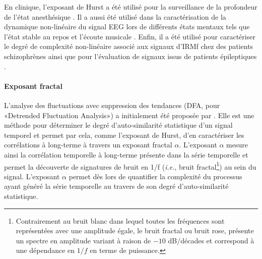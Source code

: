 En clinique, l'exposant de Hurst a été utilisé pour la surveillance de la profondeur de l'état anesthésique \citep{hosseini2018computational, lalitha2007automated, liang2012multiscale, liang2015eeg, natarajan2004nonlinear, nguyen2014monitoring, subha2010eeg}. 
Il a aussi été utilisé dans la caractérisation de la dynamique non-linéaire du signal EEG lors de différents états mentaux tels que l'état stable au repos et l'écoute musicale \citep{natarajan2004nonlinear}.
Enfin, il a été utilisé pour caractériser le degré de complexité non-linéaire associé aux signaux d'IRMf chez des patients schizophrènes \citep{sokunbi2014nonlinear} ainsi que pour l'évaluation de signaux issus de patients épileptiques \citep{kannathal2005characterization}.

\paragraph{Exposant fractal\\}
\label{alpha}

L'analyse des fluctuations avec suppression des tendances (DFA, pour «Detrended Fluctuation Analysis») a initialement été proposée par \cite{peng1993long}. 
Elle est une méthode pour déterminer le degré d'auto-similarité statistique d'un signal temporel et permet par cela, comme l'exposant de Hurst, d'en caractériser les corrélations à long-terme à travers un exposant fractal $\alpha$.
L'exposant $\alpha$ mesure ainsi la corrélation temporelle à long-terme présente dans la série temporelle et permet la découverte de signatures de bruit en 1/f (\textit{i.e.}, bruit fractal\footnote{Contrairement au bruit blanc dans lequel toutes les fréquences sont représentées avec une amplitude égale, le bruit fractal ou bruit rose, présente un spectre en amplitude variant à raison de $-10$ dB/décades et correspond à une dépendance en $1/f$ en terme de puissance.}) au sein du signal.
L'exposant $\alpha$ permet dès lors de quantifier la complexité du processus ayant généré la série temporelle au travers de son degré d'auto-similarité statistique. 

